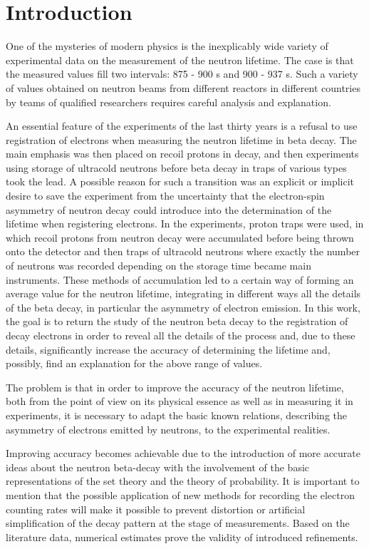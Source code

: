 \documentclass[article]{elsarticle}
\begin{document}
\section*{Introduction}
\label{intro}
One of the mysteries of modern physics is the inexplicably wide variety of experimental data on the measurement of the neutron lifetime. The case is that the measured values \cite{Zyla2020-1} fill two intervals: 875 - 900 s and 900 - 937 s. Such a variety of values obtained on neutron beams from different reactors in different countries by teams of qualified researchers requires careful analysis and explanation. 

An essential feature of the experiments of the last thirty years is a refusal to use registration of electrons when measuring the neutron lifetime in beta decay. The main emphasis was then placed on recoil protons in decay, and then experiments using storage of ultracold neutrons before beta decay in traps of various types took the lead. A possible reason for such a transition was an explicit or implicit desire to save the experiment from the uncertainty that the electron-spin asymmetry of neutron decay could introduce into the determination of the lifetime when registering electrons. In the experiments, proton traps were used, in which recoil protons from neutron decay were accumulated before being thrown onto the detector and then traps of ultracold neutrons where exactly the number of neutrons was recorded depending on the storage time became  main instruments. These methods of accumulation led to a certain way of forming an average value for the neutron lifetime, integrating in different ways all the details of the beta decay, in particular the asymmetry of electron emission. In this work, the goal is to return the study of the neutron beta decay to the registration of decay electrons in order to reveal all the details of the process and, due to these details, significantly increase the accuracy of determining the lifetime and, possibly, find an explanation for the above range of values.

The problem is that in order to improve the accuracy of the neutron lifetime, both from the point of view on its physical essence as well as in measuring it in experiments, it is necessary to adapt the basic known relations, describing the asymmetry of electrons emitted by neutrons, to the experimental realities. 

Improving accuracy becomes achievable due to the introduction of more accurate ideas about the neutron beta-decay with the involvement of the basic representations of the set theory and the theory of probability. It is important to mention that the possible application of new methods for recording the electron counting rates will make it possible to prevent distortion or artificial simplification of the decay pattern at the stage of measurements. Based on the literature data, numerical estimates prove the validity of introduced refinements.
\end{document}
